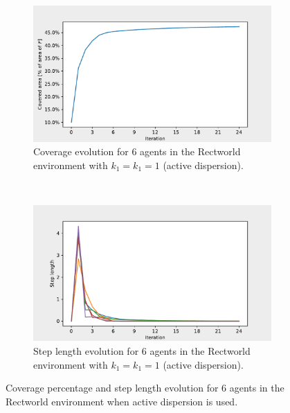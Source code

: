 \begin{figure}[H]
  \centering
  \begin{subfigure}[t]{0.5\textwidth}
    \centering
    \includegraphics[width=\textwidth]{figs/bigworld_6_agnt_k_1_1_k_2_1_area_traj.pdf}
    \caption{Coverage evolution for 6 agents in the Rectworld environment with $k_{1} = k_{1} = 1$ (active dispersion).}
    \label{fig:6_agnt_bw_k_1_1_a_traj}
  \end{subfigure}%
  ~ 
  \begin{subfigure}[t]{0.5\textwidth}
    \centering
    \includegraphics[width=\textwidth]{figs/bigworld_6_agnt_k_1_1_k_2_1_step_traj.pdf}
    \caption{Step length evolution for 6 agents in the Rectworld environment with $k_{1} = k_{1} = 1$ (active dispersion).}
    \label{fig:6_agnt_bw_k_1_1_s_traj}
  \end{subfigure}
  \caption{Coverage percentage and step length evolution for 6 agents in the Rectworld environment when active dispersion is used.}
  \label{fig:6_agnt_bw_evolution_active}
\end{figure}


